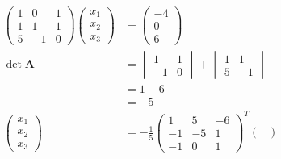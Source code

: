 \documentclass{article}
\begin{document}
\begin{align*}
  \begin{pmatrix}
    1 & 0  & 1 \\
    1 & 1  & 1 \\
    5 & -1 & 0
  \end{pmatrix} \begin{pmatrix}
                  x_1 \\
                  x_2 \\
                  x_3
                \end{pmatrix} & = \begin{pmatrix}
                                    -4 \\
                                    0  \\
                                    6
                                  \end{pmatrix}                              \\
  \det \mathbf{A}               & = \begin{vmatrix}
                                      1  & 1 \\
                                      -1 & 0
                                    \end{vmatrix} + \begin{vmatrix}
                                                      1 & 1  \\
                                                      5 & -1
                                                    \end{vmatrix}            \\
                                & = 1 - 6                                     \\
                                & = -5                                        \\
  \begin{pmatrix}
    x_1 \\
    x_2 \\
    x_3
  \end{pmatrix}               & = -\frac{1}{5} \begin{pmatrix}
                                                 1  & 5  & -6 \\
                                                 -1 & -5 & 1  \\
                                                 -1 & 0  & 1
                                               \end{pmatrix}^T \begin{pmatrix}

\end{pmatrix}
\end{align*}
\end{document}
